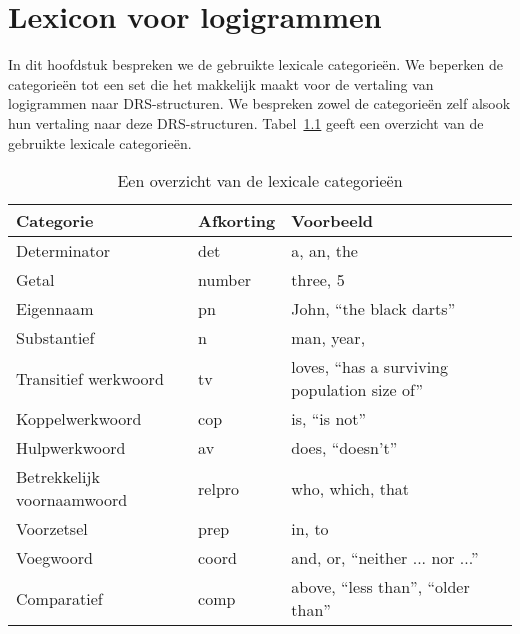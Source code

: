 \chapter{Lexicon voor logigrammen}
In dit hoofdstuk bespreken we de gebruikte lexicale categorieën. We beperken de categorieën tot een set die het makkelijk maakt voor de vertaling van logigrammen naar DRS-structuren. We bespreken zowel de categorieën zelf alsook hun vertaling naar deze DRS-structuren. Tabel~\ref{tbl:lexiconCategories} geeft een overzicht van de gebruikte lexicale categorieën.

\begin{table}[t]
  \centering
  \begin{tabular}{llll}
    \toprule
    \textbf{Categorie} & \textbf{Afkorting} & \textbf{Voorbeeld}  \\ \midrule
    Determinator       & det                & a, an, the \\
    Getal              & number             & three, 5      \\
    Eigennaam          & pn                 & John, ``the black darts'' \\
    Substantief        & n                  & man, year, \\
    Transitief werkwoord & tv               & loves, ``has a surviving population size of'' \\
    Koppelwerkwoord    & cop                & is, ``is not'' \\
    Hulpwerkwoord      & av                 & does, ``doesn't'' \\
    Betrekkelijk voornaamwoord & relpro     & who, which, that \\
    Voorzetsel         & prep               & in, to \\
    Voegwoord          & coord              & and, or, ``neither ... nor ...'' \\
    Comparatief        & comp               & above, ``less than'', ``older than'' \\
    \bottomrule
  \end{tabular}
  \caption{Een overzicht van de lexicale categorieën}
  \label{tbl:lexiconCategories}
\end{table}


